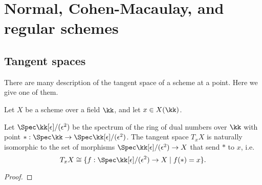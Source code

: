 \section{Normal, Cohen-Macaulay, and regular schemes}


\subsection{Tangent spaces}

    There are many description of the tangent space of a scheme at a point. 
    Here we give one of them.

    Let $X$ be a scheme over a field $\kk$, and let $x \in X(\kk)$.

    \begin{proposition}\label{prop:tangent_space_as_image_of_ring_of_dual_numbers}
        Let \(\Spec \kk[\epsilon]/(\epsilon^2)\) be the spectrum of the ring of dual numbers over \(\kk\) with point \(*:\Spec \kk \to \Spec \kk[\epsilon]/(\epsilon^2)\).
        The tangent space $T_x X$ is naturally isomorphic to the set of morphisms $\Spec \kk[\epsilon]/(\epsilon^2) \to X$ that send \(*\) to $x$, i.e.
        \[ T_x X \cong \{ f: \Spec \kk[\epsilon]/(\epsilon^2) \to X \mid f(*) = x \}. \]
    \end{proposition}
    \begin{proof}
    \end{proof}